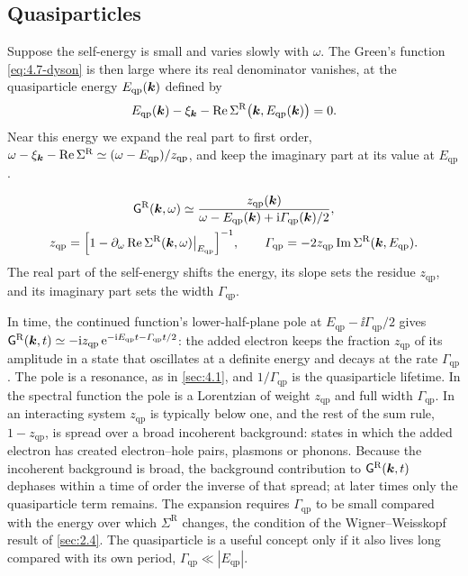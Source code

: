 \subsection{Quasiparticles}

Suppose the self-energy is small and varies slowly with $\omega$. The Green's function \cref{eq:4.7-dyson} is then large where its real denominator vanishes, at the quasiparticle energy $E_{\mathrm{qp}}(\bm{k})$ defined by
\begin{equation*}
  E_{\mathrm{qp}}(\bm{k}) - \xi_{\bm{k}} - \operatorname{Re}\Sigma^{\mathrm{R}}\bigl(\bm{k},E_{\mathrm{qp}}(\bm{k})\bigr) = 0 .
\end{equation*}
Near this energy we expand the real part to first order, $\omega - \xi_{\bm{k}} - \operatorname{Re}\Sigma^{\mathrm{R}} \simeq (\omega - E_{\mathrm{qp}})/z_{\mathrm{qp}}$, and keep the imaginary part at its value at $E_{\mathrm{qp}}$.
\begin{keyresult}[Quasiparticle]
\begin{equation}
  \begin{gathered}
  \mathsf{G}^{\mathrm{R}}(\bm{k},\omega) \simeq \frac{z_{\mathrm{qp}}(\bm{k})}{\omega - E_{\mathrm{qp}}(\bm{k}) + \mathrm{i}\varGamma_{\mathrm{qp}}(\bm{k})/2}, \\
  z_{\mathrm{qp}} = \Bigl[1 - \partial_\omega\operatorname{Re}\Sigma^{\mathrm{R}}(\bm{k},\omega)\big|_{E_{\mathrm{qp}}}\Bigr]^{-1}, \qquad
  \varGamma_{\mathrm{qp}} = -2z_{\mathrm{qp}}\operatorname{Im}\Sigma^{\mathrm{R}}(\bm{k},E_{\mathrm{qp}}) .
  \end{gathered}
  \label{eq:4.7-qp}
\end{equation}
The real part of the self-energy shifts the energy, its slope sets the residue $z_{\mathrm{qp}}$, and its imaginary part sets the width $\varGamma_{\mathrm{qp}}$.
\end{keyresult}
In time, the continued function's lower-half-plane pole at $E_{\mathrm{qp}} - \ii\varGamma_{\mathrm{qp}}/2$ gives $\mathsf{G}^{\mathrm{R}}(\bm{k},t) \simeq -\mathrm{i} z_{\mathrm{qp}}\,\mathrm{e}^{-\mathrm{i} E_{\mathrm{qp}}t - \varGamma_{\mathrm{qp}}t/2}$: the added electron keeps the fraction $z_{\mathrm{qp}}$ of its amplitude in a state that oscillates at a definite energy and decays at the rate $\varGamma_{\mathrm{qp}}$. The pole is a resonance, as in \cref{sec:4.1}, and $1/\varGamma_{\mathrm{qp}}$ is the quasiparticle lifetime. In the spectral function the pole is a Lorentzian of weight $z_{\mathrm{qp}}$ and full width $\varGamma_{\mathrm{qp}}$. In an interacting system $z_{\mathrm{qp}}$ is typically below one, and the rest of the sum rule, $1 - z_{\mathrm{qp}}$, is spread over a broad incoherent background: states in which the added electron has created electron--hole pairs, plasmons or phonons. Because the incoherent background is broad, the background contribution to $\mathsf{G}^{\mathrm{R}}(\bm{k},t)$ dephases within a time of order the inverse of that spread; at later times only the quasiparticle term remains. The expansion requires $\varGamma_{\mathrm{qp}}$ to be small compared with the energy over which $\Sigma^{\mathrm{R}}$ changes, the condition of the Wigner--Weisskopf result of \cref{sec:2.4}. The quasiparticle is a useful concept only if it also lives long compared with its own period, $\varGamma_{\mathrm{qp}} \ll |E_{\mathrm{qp}}|$.

